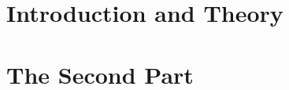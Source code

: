 \documentclass[11pt,a4paper,headsepline,footsepline,footexclude,BCOR12mm,DIV13]{scrbook}
\begin{document}
\frontmatter


    
    
    
    
    
    
    
    
    \tableofcontents
    
    

\mainmatter

    \part[Introduction and Theory]{Introduction and Theory}
    \label{part:introAndBackgroundTheory}
    
    
    
    \part[The 2nd Part]{The Second Part}
    \label{part:secondP}
    
    
    
    
    

\printindex
\glsaddall{}
\printglossaries


%
%

%

\end{document}
